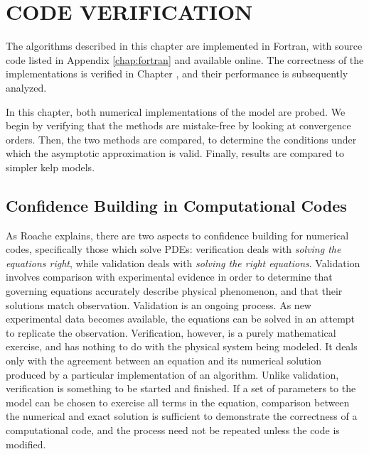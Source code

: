 \chapter{CODE VERIFICATION}
\label{chap:model_analysis}
The algorithms described in this chapter are implemented in Fortran, with source code listed in Appendix \ref{chap:fortran} and available online.
The correctness of the implementations is verified in Chapter \Rom{\ref{chap:model_analysis}}, and their performance is subsequently analyzed.

In this chapter, both numerical implementations of the model are probed.
We begin by verifying that the methods are mistake-free by looking at convergence orders.
Then, the two methods are compared, to determine the conditions under which the asymptotic
approximation is valid.
Finally, results are compared to simpler kelp models.

\section{Confidence Building in Computational Codes}
As Roache explains, there are two aspects to confidence building for numerical codes, specifically those which solve PDEs:
verification deals with \textit{solving the equations right}, while validation deals with \textit{solving the right equations}.
Validation involves comparison with experimental evidence in order to determine that governing equations
accurately describe physical phenomenon, and that their solutions match observation.
Validation is an ongoing process.
As new experimental data becomes available, the equations can be solved in an attempt to replicate the observation.
Verification, however, is a purely mathematical exercise, and has nothing to do with the physical system being modeled.
It deals only with the agreement between an equation and its numerical solution produced by a particular implementation of an algorithm.
Unlike validation, verification is something to be started and finished.
If a set of parameters to the model can be chosen to exercise all terms in the equation, comparison between the numerical and exact solution is sufficient to demonstrate the correctness of a computational code, and the process need not be repeated unless the code is modified.

